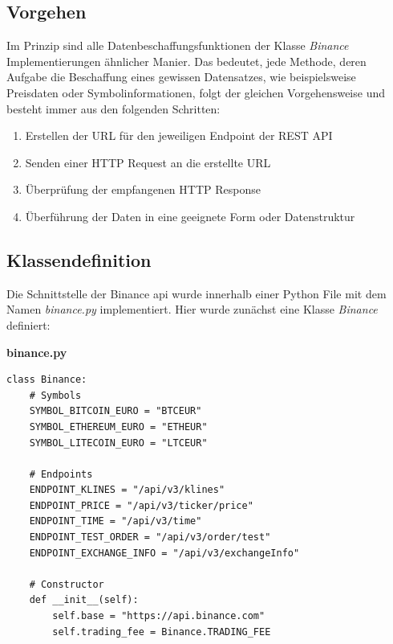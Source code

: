 \documentclass[oneside]{ausarbeitung}
\begin{document}
\subsection{Vorgehen}
\label{sub:vorgehen}

Im Prinzip sind alle Datenbeschaffungsfunktionen der Klasse \textit{Binance} Implementierungen ähnlicher Manier. Das bedeutet, jede Methode, deren Aufgabe die Beschaffung eines gewissen Datensatzes, wie beispielsweise Preisdaten oder Symbolinformationen, folgt der gleichen Vorgehensweise und besteht immer aus den folgenden Schritten:

\begin{enumerate}
	\item Erstellen der URL für den jeweiligen Endpoint der REST API
	\item Senden einer HTTP Request an die erstellte URL
	\item Überprüfung der empfangenen HTTP Response
	\item Überführung der Daten in eine geeignete Form oder Datenstruktur
\end{enumerate}

\subsection{Klassendefinition}
\label{sub:klassendefinition}

Die Schnittstelle der Binance \ac{api} wurde innerhalb einer Python File mit dem Namen \textit{binance.py} implementiert. Hier wurde zunächst eine Klasse \textit{Binance} definiert:

\lstset{language=Python}
\lstset{frame=lines}
\lstset{basicstyle=\footnotesize}
\textbf{binance.py}
\begin{lstlisting}
class Binance:
	# Symbols
    SYMBOL_BITCOIN_EURO = "BTCEUR"
    SYMBOL_ETHEREUM_EURO = "ETHEUR"
    SYMBOL_LITECOIN_EURO = "LTCEUR"

	# Endpoints
    ENDPOINT_KLINES = "/api/v3/klines"
    ENDPOINT_PRICE = "/api/v3/ticker/price"
    ENDPOINT_TIME = "/api/v3/time"
    ENDPOINT_TEST_ORDER = "/api/v3/order/test"
    ENDPOINT_EXCHANGE_INFO = "/api/v3/exchangeInfo"
	
	# Constructor
	def __init__(self):
		self.base = "https://api.binance.com"
		self.trading_fee = Binance.TRADING_FEE
\end{lstlisting}
\end{document}
